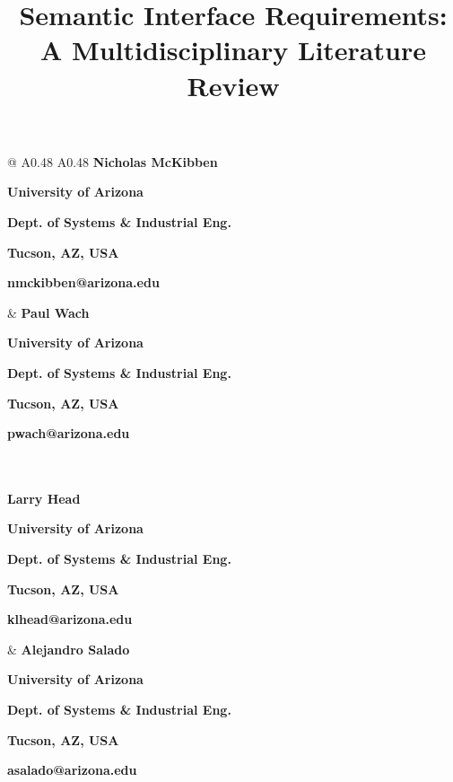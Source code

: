 \documentclass[11pt,letterpaper]{article}
\author{\mbox{}}
\date{}
\title{Semantic Interface Requirements: A Multidisciplinary Literature Review}
\newcommand{\headingfont}{\sffamily}
\newcommand{\authorcard}[5]{%
  {\headingfont\bfseries\fontsize{12pt}{14pt}\selectfont #1}\par
  {\headingfont\bfseries\fontsize{12pt}{14pt}\selectfont #2}\par
  {\headingfont\bfseries\fontsize{12pt}{14pt}\selectfont #3}\par
  {\headingfont\bfseries\fontsize{12pt}{14pt}\selectfont #4}\par
  {\headingfont\bfseries\fontsize{12pt}{14pt}\selectfont #5}\par
}
\begin{document}
\maketitle
\thispagestyle{firstpage}

\noindent
\begin{tabular*}{\textwidth}{@{\extracolsep{\fill}} A{0.48\textwidth} A{0.48\textwidth}}
  \authorcard{Nicholas McKibben}{University of Arizona}{Dept. of Systems \& Industrial Eng.}{Tucson, AZ, USA}{nmckibben@arizona.edu} &
  \authorcard{Paul Wach}{University of Arizona}{Dept. of Systems \& Industrial Eng.}{Tucson, AZ, USA}{pwach@arizona.edu} \\
   \\[-0.2\baselineskip]
  \authorcard{Larry Head}{University of Arizona}{Dept. of Systems \& Industrial Eng.}{Tucson, AZ, USA}{klhead@arizona.edu} &
  \authorcard{Alejandro Salado}{University of Arizona}{Dept. of Systems \& Industrial Eng.}{Tucson, AZ, USA}{asalado@arizona.edu}
\end{tabular*}
\end{document}
